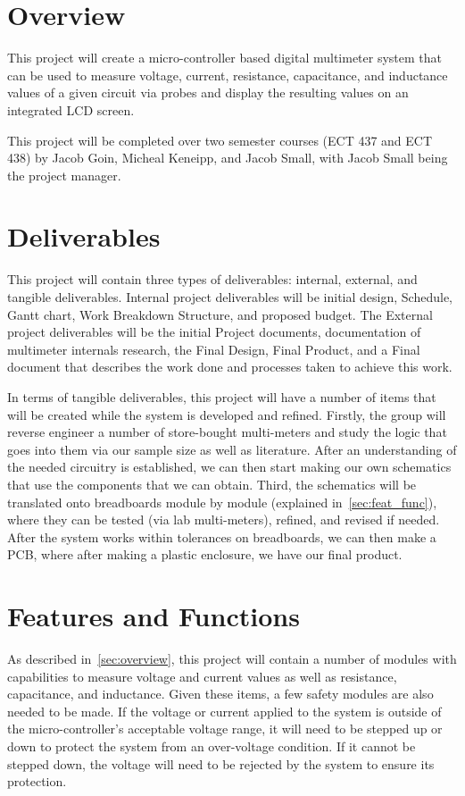 \documentclass{article}
\begin{document}
    \maketitle
    \section{Overview}\label{sec:overview}
    This project will create a micro-controller based digital multimeter system that can be used to measure voltage, current, resistance, capacitance, and inductance values of a given circuit via probes and display the resulting values on an integrated LCD screen.

    This project will be completed over two semester courses (ECT 437 and ECT 438) by Jacob Goin, Micheal Keneipp, and Jacob Small, with Jacob Small being the project manager.

    \section{Deliverables}
    This project will contain three types of deliverables: internal, external, and tangible deliverables.
    Internal project deliverables will be initial design, Schedule, Gantt chart, Work Breakdown Structure, and proposed budget.
    The External project deliverables will be the initial Project documents, documentation of multimeter internals research, the Final Design, Final Product, and a Final document that describes the work done and processes taken to achieve this work.

    In terms of tangible deliverables, this project will have a number of items that will be created while the system is developed and refined.
    Firstly, the group will reverse engineer a number of store-bought multi-meters and study the logic that goes into them via our sample size as well as literature.
    After an understanding of the needed circuitry is established, we can then start making our own schematics that use the components that we can obtain.
    Third, the schematics will be translated onto breadboards module by module (explained in~\autoref{sec:feat_func}), where they can be tested (via lab multi-meters), refined, and revised if needed.
    After the system works within tolerances on breadboards, we can then make a PCB, where after making a plastic enclosure, we have our final product.

    \section{Features and Functions}\label{sec:feat_func}
    As described in~\autoref{sec:overview}, this project will contain a number of modules with capabilities to measure voltage and current values as well as resistance, capacitance, and inductance.
    Given these items, a few safety modules are also needed to be made.
    If the voltage or current applied to the system is outside of the micro-controller's acceptable voltage range, it will need to be stepped up or down to protect the system from an over-voltage condition.
    If it cannot be stepped down, the voltage will need to be rejected by the system to ensure its protection.
\end{document}
